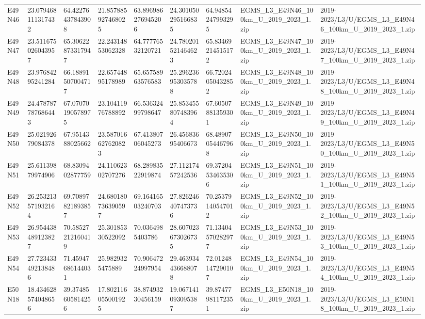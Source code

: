 \begin{landscape}
\begin{longtable}{lllllllll}
E49N46 & 23.079468111317432 & 64.42276437843908 & 21.857885927468025 & 63.896986276945206 & 24.301050295166835 & 64.94854247993295 & EGMS\_L3\_E49N46\_100km\_U\_2019\_2023\_1.zip & 2019-2023/L3/U/EGMS\_L3\_E49N46\_100km\_U\_2019\_2023\_1.zip \\
E49N47 & 23.511675026043957 & 65.30622873317947 & 22.24314853062328 & 64.77776532120721 & 24.780201521464623 & 65.83469214515172 & EGMS\_L3\_E49N47\_100km\_U\_2019\_2023\_1.zip & 2019-2023/L3/U/EGMS\_L3\_E49N47\_100km\_U\_2019\_2023\_1.zip \\
E49N48 & 23.97684295241284 & 66.18891507004717 & 22.65744895178989 & 65.65758963576583 & 25.296236953035788 & 66.72024050432852 & EGMS\_L3\_E49N48\_100km\_U\_2019\_2023\_1.zip & 2019-2023/L3/U/EGMS\_L3\_E49N48\_100km\_U\_2019\_2023\_1.zip \\
E49N49 & 24.478787787686443 & 67.07070190578975 & 23.10411976788892 & 66.53632499798647 & 25.853455807483964 & 67.60507881359301 & EGMS\_L3\_E49N49\_100km\_U\_2019\_2023\_1.zip & 2019-2023/L3/U/EGMS\_L3\_E49N49\_100km\_U\_2019\_2023\_1.zip \\
E49N50 & 25.02192679084378 & 67.9514388025662 & 23.587016627620823 & 67.41380706045273 & 26.45683695406673 & 68.48907054467968 & EGMS\_L3\_E49N50\_100km\_U\_2019\_2023\_1.zip & 2019-2023/L3/U/EGMS\_L3\_E49N50\_100km\_U\_2019\_2023\_1.zip \\
E49N51 & 25.61139879974906 & 68.8309402877759 & 24.11062302707276 & 68.28983522919874 & 27.11217457242536 & 69.37204534635306 & EGMS\_L3\_E49N51\_100km\_U\_2019\_2023\_1.zip & 2019-2023/L3/U/EGMS\_L3\_E49N51\_100km\_U\_2019\_2023\_1.zip \\
E49N52 & 26.253213571932164 & 69.70897821893857 & 24.680180736390597 & 69.16416503240703 & 27.826246407473736 & 70.25379140547012 & EGMS\_L3\_E49N52\_100km\_U\_2019\_2023\_1.zip & 2019-2023/L3/U/EGMS\_L3\_E49N52\_100km\_U\_2019\_2023\_1.zip \\
E49N53 & 26.954438489123827 & 70.58527212160419 & 25.30185330522092 & 70.0364985403786 & 28.607023673026735 & 71.13404570282977 & EGMS\_L3\_E49N53\_100km\_U\_2019\_2023\_1.zip & 2019-2023/L3/U/EGMS\_L3\_E49N53\_100km\_U\_2019\_2023\_1.zip \\
E49N54 & 27.723433492138486 & 71.45947686144031 & 25.9829325475889 & 70.90647224997954 & 29.463934436688078 & 72.01248147290107 & EGMS\_L3\_E49N54\_100km\_U\_2019\_2023\_1.zip & 2019-2023/L3/U/EGMS\_L3\_E49N54\_100km\_U\_2019\_2023\_1.zip \\
E50N18 & 18.434628574048656 & 39.37485605814256 & 17.802116055001925 & 38.87493230456159 & 19.067141093095387 & 39.87477981172351 & EGMS\_L3\_E50N18\_100km\_U\_2019\_2023\_1.zip & 2019-2023/L3/U/EGMS\_L3\_E50N18\_100km\_U\_2019\_2023\_1.zip \\

\end{longtable}
\end{landscape}
